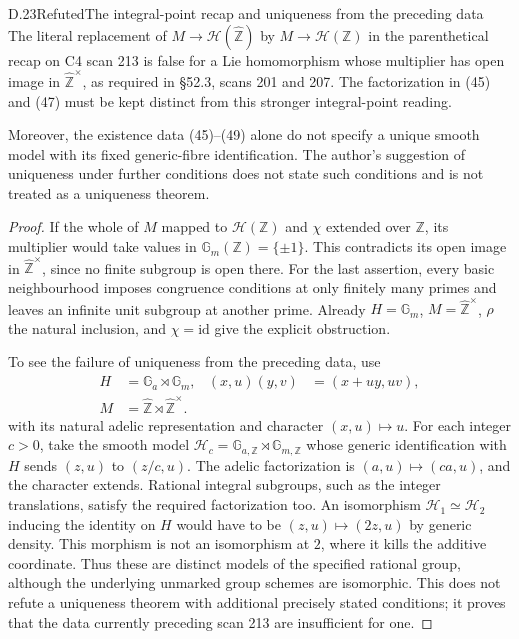 \begin{statement}{D.23}{Refuted}{The integral-point recap and uniqueness from the preceding data}
The literal replacement of $M\to\mathscr H(\widehat{\mathbb Z})$
by $M\to\mathscr H(\mathbb Z)$ in the parenthetical recap
on C4 scan 213 is false for a Lie homomorphism whose multiplier
has open image in $\widehat{\mathbb Z}^{\times}$, as required
in \S52.3, scans 201 and 207. The factorization in (45) and
(47) must be kept distinct from this stronger integral-point
reading.

Moreover, the existence data (45)--(49) alone do not specify
a unique smooth model with its fixed generic-fibre identification.
The author's suggestion of uniqueness under further conditions
does not state such conditions and is not treated as a uniqueness
theorem.
\end{statement}
\begin{proof}
If the whole of $M$ mapped to $\mathscr H(\mathbb Z)$ and
$\chi$ extended over $\mathbb Z$, its multiplier would take
values in $\mathbb G_m(\mathbb Z)=\{\pm1\}$. This contradicts
its open image in $\widehat{\mathbb Z}^{\times}$, since no
finite subgroup is open there. For the last assertion, every
basic neighbourhood imposes congruence conditions at only
finitely many primes and leaves an infinite unit subgroup at
another prime. Already $H=\mathbb G_m$, $M=\widehat{\mathbb Z}^{\times}$,
$\rho$ the natural inclusion, and $\chi=\mathrm{id}$ give
the explicit obstruction.

To see the failure of uniqueness from the preceding data, use
\[
 \begin{aligned}
 H&=\mathbb G_a\rtimes\mathbb G_m,
 & (x,u)(y,v)&=(x+uy,uv),\\
 M&=\widehat{\mathbb Z}\rtimes\widehat{\mathbb Z}^{\times}.
 \end{aligned}
\]
with its natural adelic representation and character $(x,u)\mapsto u$.
For each integer $c>0$, take the smooth model
$\mathscr H_c=\mathbb G_{a,\mathbb Z}\rtimes\mathbb G_{m,\mathbb Z}$
whose generic identification with $H$ sends $(z,u)$ to $(z/c,u)$.
The adelic factorization is $(a,u)\mapsto(ca,u)$, and the
character extends. Rational integral subgroups, such as the
integer translations, satisfy the required factorization too.
An isomorphism $\mathscr H_1\simeq\mathscr H_2$ inducing the
identity on $H$ would have to be $(z,u)\mapsto(2z,u)$ by generic
density. This morphism is not an isomorphism at $2$, where it
kills the additive coordinate. Thus these are distinct models
of the specified rational group, although the underlying
unmarked group schemes are isomorphic. This does not refute
a uniqueness theorem with additional precisely stated conditions;
it proves that the data currently preceding scan 213 are
insufficient for one.
\end{proof}

